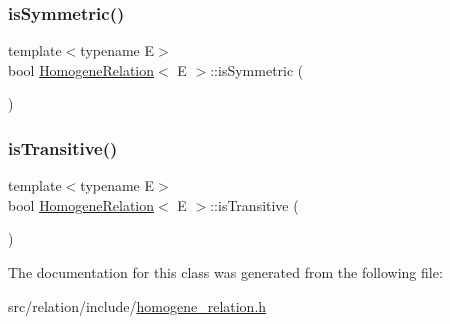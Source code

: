 \subsubsection{\texorpdfstring{is\+Symmetric()}{isSymmetric()}}
{\footnotesize\ttfamily template$<$typename E$>$ \\
bool \hyperlink{classHomogeneRelation}{Homogene\+Relation}$<$ E $>$\+::is\+Symmetric (\begin{DoxyParamCaption}{ }\end{DoxyParamCaption})}

\mbox{\label{classHomogeneRelation_adb9a19623987d7eaad03dfea1f2598c6}} 
\subsubsection{\texorpdfstring{is\+Transitive()}{isTransitive()}}
{\footnotesize\ttfamily template$<$typename E$>$ \\
bool \hyperlink{classHomogeneRelation}{Homogene\+Relation}$<$ E $>$\+::is\+Transitive (\begin{DoxyParamCaption}{ }\end{DoxyParamCaption})}



The documentation for this class was generated from the following file\+:\begin{DoxyCompactItemize}
\item 
src/relation/include/\hyperlink{homogene__relation_8h}{homogene\+\_\+relation.\+h}\end{DoxyCompactItemize}
